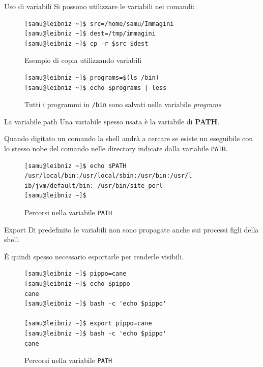 \documentclass{beamer}
\begin{document}
\begin{frame}[fragile]{Uso di variabili}
  Si possono utilizzare le variabili nei comandi:

  \begin{figure}
    \begin{lstlisting}
[samu@leibniz ~]$ src=/home/samu/Immagini
[samu@leibniz ~]$ dest=/tmp/immagini
[samu@leibniz ~]$ cp -r $src $dest
    \end{lstlisting}
    \caption{Esempio di copia utilizzando variabili}
  \end{figure}

  \begin{figure}
    \begin{lstlisting}
[samu@leibniz ~]$ programs=$(ls /bin)
[samu@leibniz ~]$ echo $programs | less
    \end{lstlisting}
    \caption{Tutti i programmi in \texttt{/bin} sono salvati nella variabile 
    \textit{programs}}
  \end{figure}
\end{frame}

\begin{frame}[fragile]{La variabile path}
  Una variabile spesso usata è la variabile di \textbf{PATH}. \medskip

  Quando digitato un comando la shell andrà a cercare se esiste un eseguibile
  con lo stesso nobe del comando nelle directory indicate dalla variabile
  \texttt{PATH}. \medskip

  \begin{figure}
    \begin{lstlisting}
[samu@leibniz ~]$ echo $PATH
/usr/local/bin:/usr/local/sbin:/usr/bin:/usr/l
ib/jvm/default/bin: /usr/bin/site_perl
[samu@leibniz ~]$
    \end{lstlisting}
    \caption{Percorsi nella variabile \texttt{PATH}}
  \end{figure}
\end{frame}

\begin{frame}[fragile]{Export}
  Di predefinito le variabili non sono propagate anche sui processi figli della
  shell. \medskip

  È quindi spesso necessario esportarle per renderle visibili. \medskip
  \begin{figure}
    \begin{lstlisting}
[samu@leibniz ~]$ pippo=cane
[samu@leibniz ~]$ echo $pippo
cane
[samu@leibniz ~]$ bash -c 'echo $pippo'

[samu@leibniz ~]$ export pippo=cane
[samu@leibniz ~]$ bash -c 'echo $pippo'
cane
    \end{lstlisting}
    \caption{Percorsi nella variabile \texttt{PATH}}
  \end{figure}
\end{frame}
\end{document}
